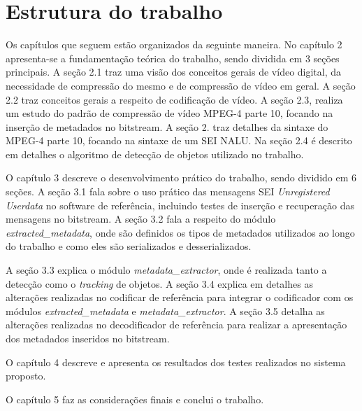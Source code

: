 \section{Estrutura do trabalho}


Os capítulos que seguem estão organizados da seguinte maneira. No capítulo 2 apresenta-se a fundamentação teórica do trabalho, sendo dividida em 3 seções principais. A seção 2.1 traz uma visão dos conceitos gerais de vídeo digital, da necessidade de compressão do mesmo e de compressão de vídeo em geral. A seção 2.2 traz conceitos gerais a respeito de codificação de vídeo. A seção 2.3, realiza um estudo do padrão de compressão de vídeo MPEG-4 parte 10, focando na inserção de metadados no bitstream. A seção 2. traz detalhes da sintaxe do MPEG-4 parte 10, focando na sintaxe de um SEI NALU. Na seção 2.4 é descrito em detalhes o algoritmo de detecção de objetos utilizado no trabalho. 

O capítulo 3 descreve o desenvolvimento prático do trabalho, sendo dividido em 6 seções. A seção 3.1 fala sobre o uso prático das mensagens SEI \textit{Unregistered Userdata} no software de referência, incluindo testes de inserção e recuperação das mensagens no bitstream. A seção 3.2 fala a respeito do módulo \textit{extracted\_metadata}, onde são definidos os tipos de metadados utilizados ao longo do trabalho e como eles são serializados e desserializados. 

A seção 3.3 explica o módulo \textit{metadata\_extractor}, onde é realizada tanto a detecção como o  \textit{tracking} de objetos. A seção 3.4 explica em detalhes as alterações realizadas no codificar de referência para integrar o codificador com os módulos \textit{extracted\_metadata} e \textit{metadata\_extractor}. A seção 3.5 detalha as alterações realizadas no decodificador de referência para realizar a apresentação dos metadados inseridos no bitstream. 

O capítulo 4 descreve e apresenta os resultados dos testes realizados no sistema proposto.

O capítulo 5 faz as considerações finais e conclui o trabalho.
